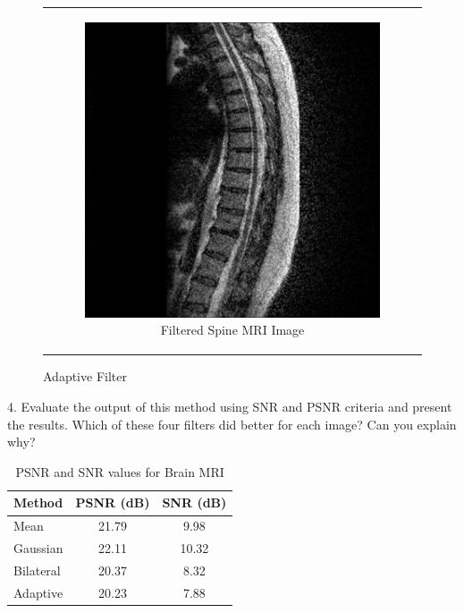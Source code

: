 \documentclass[hidelinks,12pt]{article}
\begin{document}
\begin{figure}[!h]
\begin{tabular}{c}
\begin{subfigure}[h]{0.4\textwidth}
				\includegraphics[width=\textwidth]{figures/adaptive/spine.jpg}
				\caption{Filtered Spine MRI Image}
			\end{subfigure}
		\end{tabular}
		\caption{Adaptive Filter}
	\end{figure}
	
	
	\pagebreak
	
	4. Evaluate the output of this method using SNR and PSNR criteria and present the results. Which of these four filters did better for each image? Can you explain why?
	
	
	\begin{table}[h!]
		\centering
		\begin{tabular}{lcc}
			\toprule
			Method        & PSNR (dB) & SNR (dB)  \\
			\midrule
			Mean          & 21.79      & 9.98      \\
			Gaussian      & 22.11      & 10.32     \\
			Bilateral     & 20.37      & 8.32      \\
			Adaptive      & 20.23      & 7.88      \\
			\bottomrule
		\end{tabular}
		\caption{PSNR and SNR values for Brain MRI}
	\end{table}
	
\end{document}
